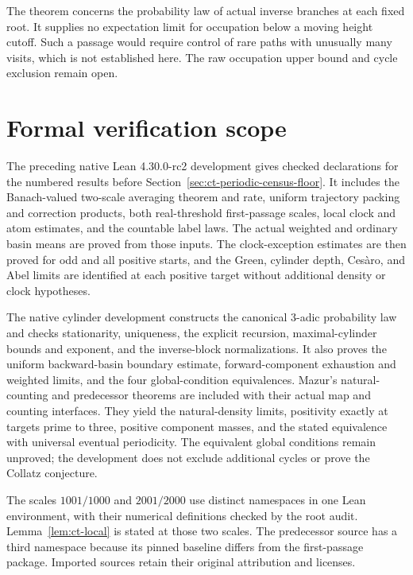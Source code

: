 \documentclass[11pt,a4paper]{article}
\begin{document}
The theorem concerns the probability law of actual inverse branches
at each fixed root. It supplies no expectation limit for occupation
below a moving height cutoff. Such a passage would require control
of rare paths with unusually many visits, which is not established
here. The raw occupation upper bound and cycle exclusion remain open.


\section{Formal verification scope}

The preceding native Lean 4.30.0-rc2 development gives checked declarations
for the numbered results before Section~\ref{sec:ct-periodic-census-floor}. It includes the Banach-valued
two-scale averaging theorem and rate, uniform trajectory packing and
correction products, both real-threshold first-passage scales, local
clock and atom estimates, and the countable label laws. The actual
weighted and ordinary basin means are proved from those inputs.
The clock-exception estimates are then proved for odd and all positive
starts, and the Green, cylinder depth, Ces\`aro, and Abel limits are
identified at each positive target without additional density or clock
hypotheses.

The native cylinder development constructs the canonical 3-adic
probability law and checks stationarity, uniqueness, the explicit
recursion, maximal-cylinder bounds and exponent, and the inverse-block
normalizations. It also proves the uniform backward-basin boundary
estimate, forward-component exhaustion and weighted limits, and the
four global-condition equivalences. Mazur's natural-counting and
predecessor theorems are included with their actual map and counting
interfaces. They yield the natural-density limits, positivity exactly
at targets prime to three, positive component masses, and the stated
equivalence with universal eventual periodicity. The equivalent global
conditions remain unproved; the development does not exclude additional
cycles or prove the Collatz conjecture.

The scales \(1001/1000\) and \(2001/2000\) use distinct namespaces in
one Lean environment, with their numerical definitions checked by the
root audit. Lemma~\ref{lem:ct-local} is stated at those two scales.
The predecessor source has a third namespace because its pinned baseline
differs from the first-passage package. Imported sources retain their
original attribution and licenses.
\end{document}
